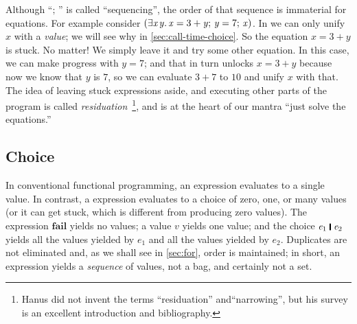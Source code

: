 \documentclass[acmsmall,review,anonymous,dvipsnames]{acmart}
\newcommand{\Varid}[1]{\mathit{#1}}
\begin{document}
Although ``\ensuremath{;\,}\!'' is called ``sequencing'', the order of that sequence
is immaterial for equations.
For example
consider \ensuremath{(\exists\Varid{x}\hspace{0.3mm}\Varid{y}.\,\Varid{x}\mathrel{=}\mathrm{3}\mathbin{+}\Varid{y};\,\Varid{y}\mathrel{=}\mathrm{7};\,\Varid{x})}.  In \versecalc{} we can only unify \ensuremath{\Varid{x}} with a \emph{value};
we will see why in \cref{sec:call-time-choice}. So the equation \ensuremath{\Varid{x}\mathrel{=}\mathrm{3}\mathbin{+}\Varid{y}} is stuck.
No matter!  We simply leave it and try some other equation. In this case, we can make progress with \ensuremath{\Varid{y}\mathrel{=}\mathrm{7}};
and that in turn unlocks \ensuremath{\Varid{x}\mathrel{=}\mathrm{3}\mathbin{+}\Varid{y}} because now we know that \ensuremath{\Varid{y}} is \ensuremath{\mathrm{7}}, so we can evaluate \ensuremath{\mathrm{3}\mathbin{+}\mathrm{7}} to \ensuremath{\mathrm{10}}
and unify \ensuremath{\Varid{x}} with that.  The idea of leaving stuck expressions aside, and executing other parts of the
program is called
\emph{residuation}~\cite{hanus:survey}\footnote{Hanus did not invent the terms ``residuation'' and``narrowing'', but
his survey is an excellent introduction and bibliography.}, and is at the heart of our mantra ``just solve the equations.''

\subsection{Choice} \label{sec:choice} \label{sec:call-time-choice}

In conventional functional programming, an expression evaluates to a single value.
In contrast, a \versecalc{} expression evaluates to a choice of zero, one, or many values (or it can get stuck, which is different from producing zero values).
The expression \ensuremath{\textbf{fail}} yields no values; a value \ensuremath{\Varid{v}} yields one value;
and the choice \ensuremath{\Varid{e}_{\mathrm{1}}\;\rule[-0.3mm]{0.5mm}{2.5mm}\;\Varid{e}_{\mathrm{2}}} yields all the values
yielded by \ensuremath{\Varid{e}_{\mathrm{1}}} and all the values yielded by \ensuremath{\Varid{e}_{\mathrm{2}}}.
Duplicates are not eliminated and, as we shall see in \cref{sec:for}, order is maintained; in short,
an expression yields a \emph{sequence} of values, not a bag, and certainly not a set.
\end{document}
